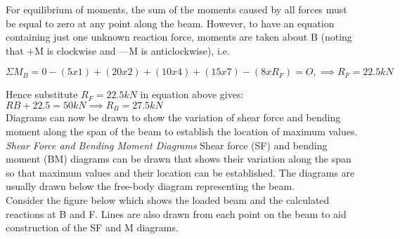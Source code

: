\documentclass[12pt, letterpaper, twoside]{article}
\begin{document}
\begin{center}
\end{center}

\bigskip

For equilibrium of moments, the sum of the moments caused by all forces must be equal to zero at any point along the beam. However, to have an equation containing just one unknown reaction force, moments are taken about B (noting that +M is clockwise and —M is anticlockwise), i.e.

\begin{equation}
\Sigma M_B = 0 -(5x1) + (20x2) + (10x4) + (15x7) - (8xR_F) = O, \implies	R_F = 22.5 kN
\end{equation}

Hence substitute $R_F = 22.5 kN$ in equation above gives: $RB + 22.5 = 50kN \implies	R_B = 27.5 kN$ \\

Diagrams can now be drawn to show the variation of shear force and bending moment along the span of the beam to establish the location of maximum values.\\

\emph{Shear Force and Bending Moment Diagrams}
Shear force (SF) and bending moment (BM) diagrams can be drawn that shows their variation along the span so that maximum values and their location can be established. The diagrams are usually drawn below the free-body diagram representing the beam.\\
Consider the figure below which shows the loaded beam and the calculated reactions at B and F. Lines are also drawn from each point on the beam to aid construction of the SF and M diagrams.
\end{document}
